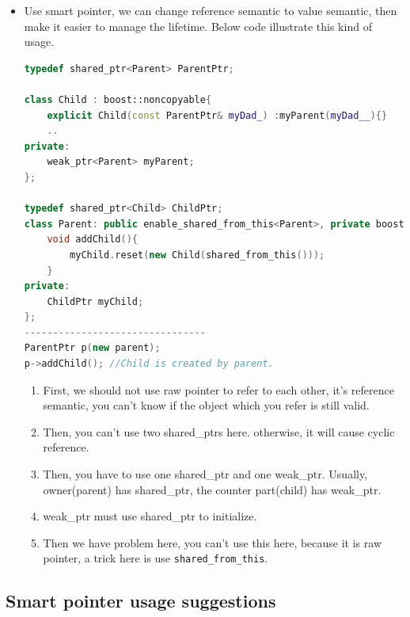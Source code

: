\documentclass[a4paper,11pt,twoside]{book}
\begin{document}
\begin{itemize}
	\item Use smart pointer, we can change reference semantic to value semantic, then make it easier to manage the lifetime. Below code illustrate this kind of usage. 
	
\begin{lstlisting}[frame=single, language=c++, mathescape=true]
typedef shared_ptr<Parent> ParentPtr;

class Child : boost::noncopyable{
	explicit Child(const ParentPtr& myDad_) :myParent(myDad__){}
	..
private:
	weak_ptr<Parent> myParent;
}; 

typedef shared_ptr<Child> ChildPtr;
class Parent: public enable_shared_from_this<Parent>, private boost::noncopyable{
  	void addChild(){
  		myChild.reset(new Child(shared_from_this()));
  	}
private:
	ChildPtr myChild;
};
--------------------------------
ParentPtr p(new parent);
p->addChild(); //Child is created by parent.
\end{lstlisting}
\begin{enumerate}
	\item First, we should not use raw pointer to refer to each other, it's reference semantic, you can't know if the object which you refer is still valid.
	
	\item Then, you can't use two shared\_ptrs here. otherwise, it will cause cyclic reference.
	
	\item Then, you have to use one shared\_ptr and one weak\_ptr. Usually, owner(parent) has shared\_ptr, the counter part(child) has weak\_ptr. 
	
	\item weak\_ptr must use shared\_ptr to initialize. 
	
	\item Then we have problem here, you can't use this here, because it is raw pointer, a trick here is use \texttt{shared\_from\_this}.
\end{enumerate}

	
	
\end{itemize}

\subsection{Smart pointer usage suggestions}
\end{document}
